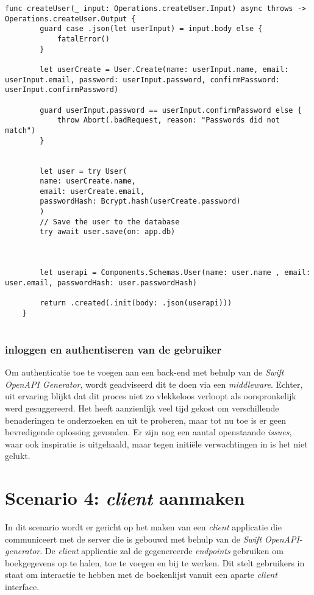 \begin{lstlisting}[caption=handler file]
    func createUser(_ input: Operations.createUser.Input) async throws -> Operations.createUser.Output {
        guard case .json(let userInput) = input.body else {
            fatalError()
        }
        
        let userCreate = User.Create(name: userInput.name, email: userInput.email, password: userInput.password, confirmPassword: userInput.confirmPassword)
        
        guard userInput.password == userInput.confirmPassword else {
            throw Abort(.badRequest, reason: "Passwords did not match")
        }
        
        
        let user = try User(
        name: userCreate.name,
        email: userCreate.email,
        passwordHash: Bcrypt.hash(userCreate.password)
        )
        // Save the user to the database
        try await user.save(on: app.db)
        
        
        
        let userapi = Components.Schemas.User(name: user.name , email: user.email, passwordHash: user.passwordHash)
        
        return .created(.init(body: .json(userapi)))
    }
    
\end{lstlisting}
 
 \subsubsection{inloggen en authentiseren van de gebruiker}
Om authenticatie toe te voegen aan een back-end met behulp van de \textit{Swift OpenAPI Generator}, wordt geadviseerd dit te doen via een  \textit{middleware}.  Echter, uit ervaring blijkt dat dit proces niet zo vlekkeloos verloopt als oorspronkelijk werd gesuggereerd. Het heeft aanzienlijk veel tijd gekost om verschillende benaderingen te onderzoeken en uit te proberen, maar tot nu toe is er geen bevredigende oplossing gevonden. Er zijn nog een aantal openstaande  \textit{issues}, waar ook inspiratie is uitgehaald, maar tegen initiële verwachtingen in is het niet gelukt. 
  \newpage
 
\section{Scenario 4: \textit{client} aanmaken}
In dit scenario wordt er gericht op het maken van een \textit{client} applicatie die communiceert met de server die is gebouwd met behulp van de  \textit{Swift OpenAPI-generator}. De \textit{client} applicatie zal de gegenereerde \textit{endpoints} gebruiken om boekgegevens op te halen, toe te voegen en bij te werken. Dit stelt gebruikers in staat om interactie te hebben met de boekenlijst vanuit een aparte \textit{client} interface.


